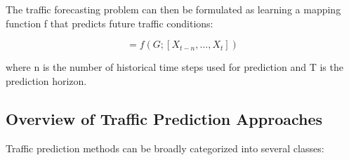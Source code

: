 \documentclass[pdflatex,sn-mathphys-num]{sn-jnl}%
\theoremstyle{thmstyleone}%
\theoremstyle{thmstyletwo}%
\theoremstyle{thmstylethree}%
\begin{document}
The traffic forecasting problem can then be formulated as learning a mapping function f that predicts future traffic conditions:

\begin{equation}
[X_{t+1},\ldots,X_{t+T}] = f(G;[X_{t-n},\ldots,X_t])
\end{equation}

where n is the number of historical time steps used for prediction and T is the prediction horizon.

\subsection{Overview of Traffic Prediction Approaches}

Traffic prediction methods can be broadly categorized into several classes:
\end{document}

